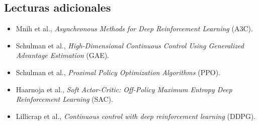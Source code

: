\subsection{Lecturas adicionales}
\begin{itemize}
    \item Mnih et al., \textit{Asynchronous Methods for Deep Reinforcement Learning} (A3C).
    \item Schulman et al., \textit{High-Dimensional Continuous Control Using Generalized Advantage Estimation} (GAE).
    \item Schulman et al., \textit{Proximal Policy Optimization Algorithms} (PPO).
    \item Haarnoja et al., \textit{Soft Actor-Critic: Off-Policy Maximum Entropy Deep Reinforcement Learning} (SAC).
    \item Lillicrap et al., \textit{Continuous control with deep reinforcement learning} (DDPG).
\end{itemize}


